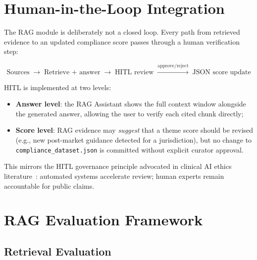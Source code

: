 \section{Human-in-the-Loop Integration}
\label{sec:rag-hitl-full}

The RAG module is deliberately not a closed loop. Every path from retrieved
evidence to an updated compliance score passes through a human verification
step:

\begin{equation}
\text{Sources}
\;\longrightarrow\; \text{Retrieve + answer}
\;\longrightarrow\; \text{HITL review}
\;\xrightarrow{\text{approve/reject}}\; \text{JSON score update}
\end{equation}

HITL is implemented at two levels:

\begin{itemize}[noitemsep]
  \item \textbf{Answer level}: the RAG Assistant shows the full context window
        alongside the generated answer, allowing the user to verify each cited
        chunk directly;
  \item \textbf{Score level}: RAG evidence may \emph{suggest} that a theme
        score should be revised (e.g., new post-market guidance detected for
        a jurisdiction), but no change to \texttt{compliance\_dataset.json} is
        committed without explicit curator approval.
\end{itemize}

This mirrors the HITL governance principle advocated in clinical AI ethics
literature~\cite{char2018}: automated systems accelerate review; human experts
remain accountable for public claims.

\section{RAG Evaluation Framework}
\label{sec:rag-eval-full2}

\subsection{Retrieval Evaluation}
\label{sec:rag-eval-ret}

